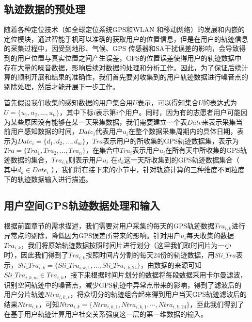 \subsection{轨迹数据的预处理}
随着各种定位技术（如全球定位系统GPS和WLAN 和移动网络）的发展和内嵌的定位模块，通过智能手机可以准确的获取用户的位置信息，但是在用户的轨迹信息的采集过程中，因受到地形、气候、GPS 传感器和SA干扰误差的影响，会导致得到的用户位置与真实位置之间产生误差，GPS的位置误差使得用户的轨迹数据中存在大量的噪音数据，影响后续对数据的处理和分析工作。因此，为了保证后续计算的顺利开展和结果的准确性，我们首先要对收集到的用户轨迹数据进行噪音点的剔除处理，然后才能开展下一步工作。
\par 首先假设我们收集的感知数据的用户集合用$U$表示，可以得知集合$U$的表达式为$U=\{u_{1},u_{2},...,u_{n}\}$，其中下标$i$表示第$i$个用户。同时，因为有的志愿者用户可能因为某些原因没有能够在某一天采集数据，我们需要建立一个表$Date$来表示采集当前用户感知数据的时间，$Date_{i}$代表用户$u_{i}$在整个数据采集周期内的具体日期，表示为$Date_{i}=\{d_{1},d_{2},...,d_{m}\}$，$Tra$表示用户的所收集的GPS轨迹数据集，表示为$Tra=\{Tra_{1},Tra_{2},...,Tra_{n}\}$，在集合中$Tra_{i}$表示用户$u_{i}$在所有天中所收集的GPS轨迹数据的集合，$Tra_{i,k}$则表示用户$u_{i}$ 在$d_{k}$这一天所收集到的GPS轨迹数据集合（ 其中$ d_{k} \in Date_{i}$ ），我们将在接下来的小节中，针对轨迹计算的三种维度不同粒度下的轨迹数据输入进行描述。
\subsection{用户空间GPS轨迹数据处理和输入}
根据前面章节的需求描述，我们需要对用户采集的每天的GPS轨迹数据$Tra_{i,k}$进行异常点的剔除，降低因为GPS误差所带来的影响。针对用户$u_{i}$每天收集的数据$Tra_{i,k}$，我们将原始轨迹数据按照时间片进行划分（这里我们取时间片为一小时），因此我们得到了$Tra_{i,k}$按照时间片分割的每天24份的轨迹数据，用$Sli\_Tra$表示，$Sli\_Tra_{i,k}=\{Sli\_Tra_{i,k,1},...,Sli\_Tra_{i,k,24}\}$，由数据的来源可知$Sli\_Tra_{i,k,m} \in Tra_{i,k}$，接下来根据时间片划分的数据将每段数据采用卡尔曼滤波，识别空间轨迹中的噪音点，减少GPS轨迹中异常点带来的影响，得到了滤波后的用户分片轨迹$Ntra_{i,k,s}$，将众切分的轨迹组合起来得到用户当天GPS轨迹滤波后的结果$Ntra_{i,k}$，可知$Ntra_{i,k}=\{ Ntra_{i,k,1},Ntra_{i,k,1}, \cdots,Ntra_{i,k,24}\}$，至此我们得到了在基于用户轨迹计算用户社交关系强度这一层的第一维数据的输入。
